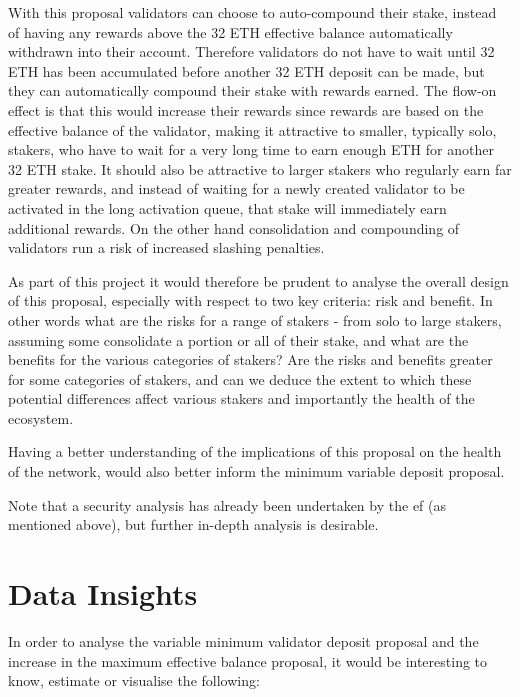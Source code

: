 \documentclass[UTF8]{article}
\begin{document}
With this proposal validators can choose to auto-compound their stake, instead of having any rewards above the 32 ETH effective balance automatically withdrawn into their account. Therefore validators do not have to wait until 32 ETH has been accumulated before another 32 ETH deposit can be made, but they can automatically compound their stake with rewards earned. The flow-on effect is that this would increase their rewards since rewards are based on the effective balance of the validator, making it attractive to smaller, typically solo, stakers, who have to wait for a very long time to earn enough ETH for another 32 ETH stake. It should also be attractive to larger stakers who regularly earn far greater rewards, and instead of waiting for a newly created validator to be activated in the long activation queue, that stake will immediately earn additional rewards. On the other hand consolidation and compounding of validators run a risk of increased slashing penalties.

As part of this project it would therefore be prudent to analyse the overall design of this proposal, especially with respect to two key criteria: risk and benefit. In other words what are the risks for a range of stakers - from solo to large stakers, assuming some consolidate a portion or all of their stake, and what are the benefits for the various categories of stakers? Are the risks and benefits greater for some categories of stakers, and can we deduce the extent to which these potential differences affect various stakers and importantly the health of the ecosystem.
 
Having a better understanding of the implications of this proposal on the health of the network, would also better inform the minimum variable deposit proposal.

Note that a security analysis has already been undertaken by the \gls{ef} (as mentioned above), but further in-depth analysis is desirable.

\section{Data Insights}
\label{sec:insights}
In order to analyse the variable minimum validator deposit proposal and the increase in the maximum effective balance proposal, it would be interesting to know, estimate or visualise the following:
\end{document}
